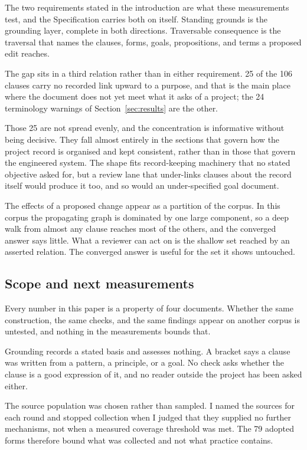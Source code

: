 The two requirements stated in the introduction are what these measurements test, and the Specification carries both on itself. Standing grounds is the grounding layer, complete in both directions. Traversable consequence is the traversal that names the clauses, forms, goals, propositions, and terms a proposed edit reaches.

The gap sits in a third relation rather than in either requirement. 25 of the 106 clauses carry no recorded link upward to a purpose, and that is the main place where the document does not yet meet what it asks of a project; the 24 terminology warnings of Section~\ref{sec:results} are the other.

Those 25 are not spread evenly, and the concentration is informative without being decisive. They fall almost entirely in the sections that govern how the project record is organised and kept consistent, rather than in those that govern the engineered system. The shape fits record-keeping machinery that no stated objective asked for, but a review lane that under-links clauses about the record itself would produce it too, and so would an under-specified goal document.

The effects of a proposed change appear as a partition of the corpus. In this corpus the propagating graph is dominated by one large component, so a deep walk from almost any clause reaches most of the others, and the converged answer says little. What a reviewer can act on is the shallow set reached by an asserted relation. The converged answer is useful for the set it shows untouched.

\subsection{Scope and next measurements}

Every number in this paper is a property of four documents. Whether the same construction, the same checks, and the same findings appear on another corpus is untested, and nothing in the measurements bounds that.

Grounding records a stated basis and assesses nothing. A bracket says a clause was written from a pattern, a principle, or a goal. No check asks whether the clause is a good expression of it, and no reader outside the project has been asked either.

The source population was chosen rather than sampled. I named the sources for each round and stopped collection when I judged that they supplied no further mechanisms, not when a measured coverage threshold was met. The 79 adopted forms therefore bound what was collected and not what practice contains.

